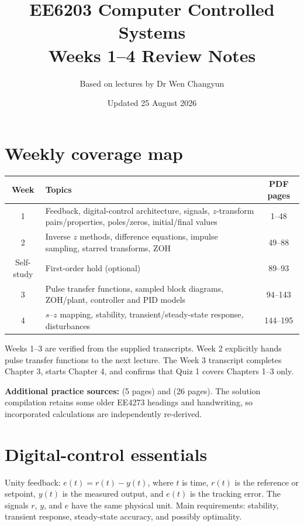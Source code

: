 \documentclass[10pt]{article}
\title{EE6203 Computer Controlled Systems\\\large Weeks 1--4 Review Notes}
\author{Based on lectures by Dr Wen Changyun}
\date{Updated 25 August 2026}
\newcommand{\weeklabel}[1]{\par\smallskip\noindent{\color{blue!60!black}\textbf{#1}}\par\smallskip}
\begin{document}
\maketitle
\tableofcontents

\section*{Weekly coverage map}

\begin{center}
\begin{tabular}{c p{} c}
\toprule
Week & Topics & PDF pages\\
\midrule
1 & Feedback, digital-control architecture, signals, $z$-transform pairs/properties, poles/zeros, initial/final values & 1--48\\
2 & Inverse $z$ methods, difference equations, impulse sampling, starred transforms, ZOH & 49--88\\
Self-study & First-order hold (optional) & 89--93\\
3 & Pulse transfer functions, sampled block diagrams, ZOH/plant, controller and PID models & 94--143\\
4 & $s$--$z$ mapping, stability, transient/steady-state response, disturbances & 144--195\\
\bottomrule
\end{tabular}
\end{center}

Weeks 1--3 are verified from the supplied transcripts. Week 2 explicitly hands pulse transfer functions to the next lecture. The Week 3 transcript completes Chapter 3, starts Chapter 4, and confirms that Quiz 1 covers Chapters 1--3 only.

\textbf{Additional practice sources:}  (5 pages) and  (26 pages). The solution compilation retains some older EE4273 headings and handwriting, so incorporated calculations are independently re-derived.

\section{Digital-control essentials}

\weeklabel{Week 1}

Unity feedback: $e(t)=r(t)-y(t)$, where $t$ is time, $r(t)$ is the reference or setpoint, $y(t)$ is the measured output, and $e(t)$ is the tracking error. The signals $r$, $y$, and $e$ have the same physical unit. Main requirements: stability, transient response, steady-state accuracy, and possibly optimality.
\end{document}
